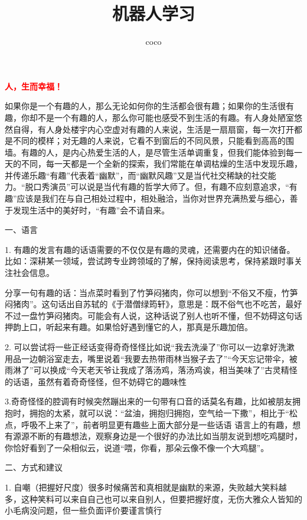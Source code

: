 \documentclass[a4paper]{article}
\title{\heiti\zihao{2} 机器人学习}
\author{\songti coco}
\begin{document}
    \maketitle

{\centering\textcolor{red}{\large\textbf{人，生而幸福！}}\par}


如果你是一个有趣的人，那么无论如何你的生活都会很有趣；如果你的生活很有趣，你却不是一个有趣的人，那么你可能也感受不到生活的有趣。有人身处陋室悠然自得，有人身处楼宇内心空虚对有趣的人来说，生活是一扇扇窗，每一次打开都是不同的模样；对无趣的人来说，它看不到窗后的不同风景，只能看到高高的围墙。有趣的人，是内心热爱生活的人，是尽管生活单调重复，但我们能体验到每一天的不同，每一天都是一个全新的探索，我们常能在单调枯燥的生活中发现乐趣，并传递乐趣“有趣”代表着“幽默”，而“幽默风趣”又是当代社交稀缺的社交能力。“脱口秀演员”可以说是当代有趣的哲学大师了。但，有趣不应刻意追求，“有趣”应该是我们在与自己相处过程中，相处融洽，当你对世界充满热爱与细心，善于发现生活中的美好时，“有趣”会不请自来。

一、语言

1. 有趣的发言有趣的话语需要的不仅仅是有趣的灵魂，还需要内在的知识储备。
比如：深耕某一领域，尝试跨专业跨领域的了解，保持阅读思考，保持紧跟时事关注社会信息。

分享一句有趣的话：当点菜时看到了竹笋闷猪肉，你可以想到“不俗又不瘦，竹笋闷猪肉”。这句话出自苏轼的《于潜僧绿筠轩》，意思是：既不俗气也不吃苦，最好不过一盘竹笋闷猪肉。可能会有人说，这种话说了别人也听不懂，但不妨碍这句话押韵上口，听起来有趣。如果恰好遇到懂它的人，那真是乐趣加倍。

2. 可以尝试将一些正经话变得奇奇怪怪比如说“我去洗澡了”你可以一边拿好洗漱用品一边朝浴室走去，嘴里说着“我要去热带雨林当猴子去了”“今天忘记带伞，被雨淋了”可以换成“今天老天爷让我成了落汤鸡，落汤鸡诶，相当美味了”古灵精怪的话语，虽然有着奇奇怪怪，但不妨碍它的趣味性

3.奇奇怪怪的腔调有时候突然蹦出来的一句带有口音的话莫名有趣，比如被朋友拥抱时，拥抱的太紧，就可以说：“盆油，拥抱归拥抱，空气给一下撒”，相比于“松点，呼吸不上来了”，前者明显更有趣些上面大部分是一些话语 语言上的有趣，想有源源不断的有趣想法，观察身边是一个很好的办法比如当朋友说到想吃鸡腿时，你恰好看到了一朵相似云，说道“喂，你看，那朵云像不像一个大鸡腿”。

二、方式和建议

1. 自嘲（把握好尺度）很多时候痛苦和真相就是幽默的来源，失败越大笑料越多，这种笑料可以来自自己也可以来自别人，但要把握好度，无伤大雅众人皆知的小毛病没问题，但一些负面评价要谨言慎行
\end{document}
